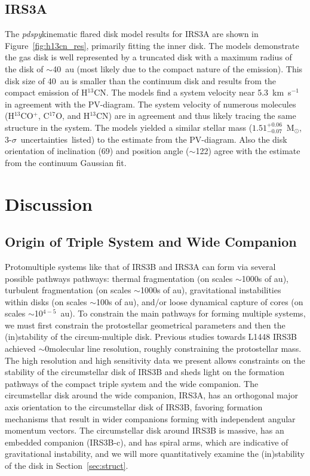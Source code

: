 \documentclass[twocolumn, 12pt]{aastex63}
\newcommand{\htcn}{H$^{13}$CN}
\newcommand{\cso}{C$^{17}$O}
\newcommand{\htcop}{H$^{13}$CO$^+$}
\renewcommand{\deg}{\degr}
\newcommand{\pdspy}{\textit{pdspy}}
\newcommand{\ab}{$\sim$}
\newcommand{\solm}{M$_{\odot}$}
\begin{document}
\subsection{IRS3A}
The \pdspy\space kinematic flared disk model results for IRS3A are shown in Figure~\ref{fig:h13cn_res}, primarily fitting the inner disk. The models demonstrate the gas disk is well represented by a truncated disk with a maximum radius of the disk of \ab40~au (most likely due to the compact nature of the emission). This disk size of 40~au is smaller than the continuum disk and results from the compact emission of \htcn. The models find a system velocity near 5.3~km~s$^{-1}$\space in agreement with the PV-diagram. The system velocity of numerous molecules (\htcop, \cso, and \htcn) are in agreement and thus likely tracing the same structure in the system. The models yielded a similar stellar mass ($1.51^{+0.06}_{-0.07}$~\solm, 3-$\sigma$~uncertainties~listed) to the estimate from the PV-diagram. Also the disk orientation of inclination (69\deg) and position angle (\ab122\deg) agree with the estimate from the continuum Gaussian fit.


\section{Discussion}\label{sec:discussion}

\subsection{Origin of Triple System and Wide Companion}\label{sec:origin}
Protomultiple systems like that of IRS3B and IRS3A can form via several possible pathways pathways: thermal fragmentation (on scales \ab1000s of au), turbulent fragmentation (on scales \ab1000s of au), gravitational instabilities within disks (on scales \ab100s of au), and/or loose dynamical capture of cores (on scales \ab10$^{4-5}$~au). To constrain the main pathways for forming multiple systems, we must first constrain the protostellar geometrical parameters and then the (in)stability of the circum-multiple disk. Previous studies towards L1448 IRS3B \citep[see ][]{2016Natur.538..483T} achieved \ab0\space molecular line resolution, roughly constraining the protostellar mass. The high resolution and high sensitivity data we present allows constraints on the stability of the circumstellar disk of IRS3B and sheds light on the formation pathways of the compact triple system and the wide companion. The circumstellar disk around the wide companion, IRS3A, has an orthogonal major axis orientation to the circumstellar disk of IRS3B, favoring formation mechanisms that result in wider companions forming with independent angular momentum vectors. The circumstellar disk around IRS3B is massive, has an embedded companion (IRS3B-c), and has spiral arms, which are indicative of gravitational instability, and we will more quantitatively examine the (in)stability of the disk in Section~\ref{sec:struct}.
\end{document}

